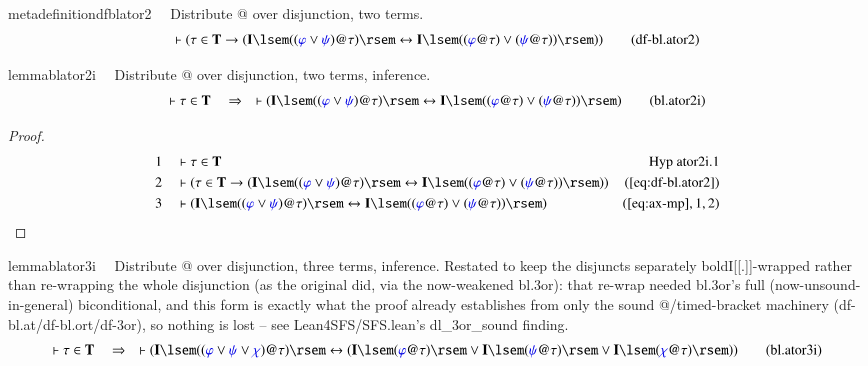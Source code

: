 \begin{restatable}{metadefinition}{dfblator2}~~ Distribute @ over disjunction, two
terms.
\begin{align}
\vdash ( \tau \in \mathbf{T} \rightarrow ( \mathbf{I} \lsem ( ( \mw{\varphi}
    \vee \mw{\psi} ) @ \tau ) \rsem \leftrightarrow \mathbf{I} \lsem ( (
    \mw{\varphi} @ \tau ) \vee ( \mw{\psi} @ \tau ) ) \rsem )
    )\label{eq:df-bl.ator2}\tag{df-bl.ator2}
\end{align}
\end{restatable}

\begin{restatable}{lemma}{blator2i}~~ Distribute @ over disjunction, two terms,
inference.
\begin{align}
\vdash \tau \in \mathbf{T}\quad\Rightarrow\quad \vdash ( \mathbf{I} \lsem ( (
    \mw{\varphi} \vee \mw{\psi} ) @ \tau ) \rsem \leftrightarrow \mathbf{I}
    \lsem ( ( \mw{\varphi} @ \tau ) \vee ( \mw{\psi} @ \tau ) ) \rsem
    )\label{eq:bl.ator2i}\tag{bl.ator2i}
\end{align}
\end{restatable}

\begin{proof}
\begin{align}
  1 &&  & \vdash \tau \in \mathbf{T}&\text{Hyp~ator2i.1}\notag%
  \\ 2 &&  & \vdash ( \tau \in \mathbf{T} \rightarrow ( \mathbf{I} \lsem ( (
      \mw{\varphi} \vee \mw{\psi} ) @ \tau ) \rsem
      \leftrightarrow \mathbf{I} \lsem ( ( \mw{\varphi} @
      \tau ) \vee ( \mw{\psi} @ \tau ) ) \rsem )
      )&(\mbox{\ref{eq:df-bl.ator2}})\notag
  \\ 3 &&  & \vdash ( \mathbf{I} \lsem ( ( \mw{\varphi} \vee \mw{\psi} ) @ \tau
      ) \rsem \leftrightarrow \mathbf{I} \lsem ( (
      \mw{\varphi} @ \tau ) \vee ( \mw{\psi} @ \tau ) )
      \rsem )&(\mbox{\ref{eq:ax-mp}},1,2)\notag
\end{align}
\end{proof}

\begin{restatable}{lemma}{blator3i}~~ Distribute @ over disjunction, three
terms, inference.  Restated to keep the disjuncts separately
boldI[[.]]-wrapped rather than re-wrapping the whole disjunction (as the
original did, via the now-weakened bl.3or): that re-wrap needed bl.3or's
full (now-unsound-in-general) biconditional, and this form is exactly what
the proof already establishes from only the sound @/timed-bracket machinery
(df-bl.at/df-bl.ort/df-3or), so nothing is lost -- see Lean4SFS/SFS.lean's
dl\_3or\_sound finding.
\begin{align}
\vdash \tau \in \mathbf{T}\quad\Rightarrow\quad \vdash ( \mathbf{I} \lsem ( (
    \mw{\varphi} \vee \mw{\psi} \vee \mw{\chi} ) @ \tau ) \rsem
    \leftrightarrow ( \mathbf{I} \lsem ( \mw{\varphi} @ \tau ) \rsem \vee
    \mathbf{I} \lsem ( \mw{\psi} @ \tau ) \rsem \vee \mathbf{I} \lsem (
    \mw{\chi} @ \tau ) \rsem ) )\label{eq:bl.ator3i}\tag{bl.ator3i}
\end{align}
\end{restatable}

